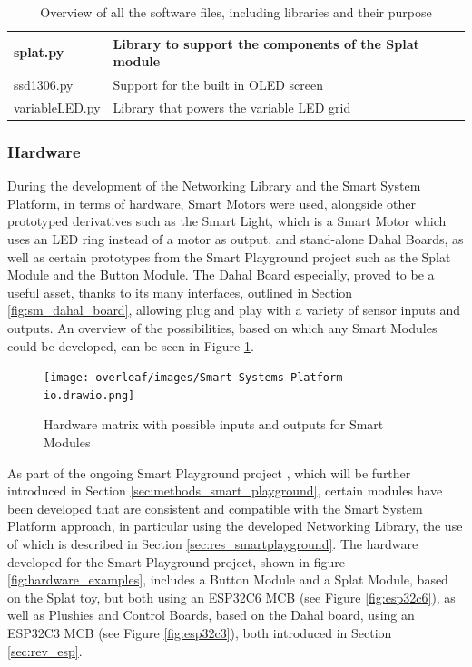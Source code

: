 \begin{table}[H]
\begin{tabular}{|l|p{180pt}|l|}
        \hline
        splat.py & Library to support the components of the Splat module & \citet{hankin_smart_nodate} \\
        \hline
        ssd1306.py & Support for the built in OLED screen & \citet{lehmann_micropython_nodate} \\
        \hline
        variableLED.py & Library that powers the variable LED grid & \citet{hankin_smart_nodate} \\
        \hline
    \end{tabular}
    \vspace{\ftspace}
    \caption{Overview of all the software files, including libraries and their purpose}
    \label{tab:software_files}
\end{table}

\subsubsection{\label{sec:methods_hw}Hardware}
During the development of the Networking Library and the Smart System Platform, in terms of hardware, Smart Motors were used, alongside other prototyped derivatives such as the Smart Light, which is a Smart Motor which uses an LED ring instead of a motor as output, and stand-alone Dahal Boards, as well as certain prototypes from the Smart Playground project such as the Splat Module and the Button Module. The Dahal Board especially, proved to be a useful asset, thanks to its many interfaces, outlined in Section \ref{fig:sm_dahal_board}, allowing plug and play with a variety of sensor inputs and outputs. An overview of the possibilities, based on which any Smart Modules could be developed, can be seen in Figure \ref{fig:met_hardware}.

\begin{figure}[H]
    \centering
    \texttt{[image: overleaf/images/Smart Systems Platform-io.drawio.png]}
    \vspace{\ftspace}
    \caption{Hardware matrix with possible inputs and outputs for Smart Modules}
    \label{fig:met_hardware}
\end{figure}

As part of the ongoing Smart Playground project \citep{blake-west_smart_2025}, which will be further introduced in Section \ref{sec:methods_smart_playground}, certain modules have been developed that are consistent and compatible with the Smart System Platform approach, in particular using the developed Networking Library, the use of which is described in Section \ref{sec:res_smartplayground}. The hardware developed for the Smart Playground project, shown in figure \ref{fig:hardware_examples}, includes a Button Module and a Splat Module, based on the Splat toy, but both using an ESP32C6 MCB (see Figure \ref{fig:esp32c6}), as well as Plushies and Control Boards, based on the Dahal board, using an ESP32C3 MCB (see Figure \ref{fig:esp32c3}), both introduced in Section \ref{sec:rev_esp}.

